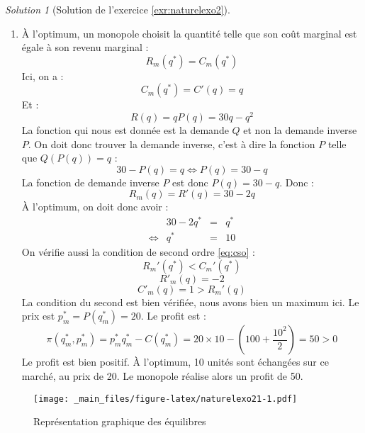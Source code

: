 \documentclass[
]{book}
\providecommand{\tightlist}{%
  \setlength{\itemsep}{0pt}\setlength{\parskip}{0pt}}
\theoremstyle{definition}
\theoremstyle{definition}
\theoremstyle{definition}
\theoremstyle{definition}
\theoremstyle{remark}
\newtheorem*{solution}{Solution}
\begin{document}
\begin{solution}[Solution de l'exercice \ref{exr:naturelexo2}]

\begin{enumerate}
\def\labelenumi{\arabic{enumi}.}
\tightlist
\item
  À l'optimum, un monopole choisit la quantité telle que son coût marginal est égale à son revenu marginal :
  \[R_m(q^*)=C_m(q^*)\]
  Ici, on a :
  \[C_m(q^*)=C'(q)=q\]
  Et :
  \[R(q) =qP(q)=30q-q^2\]
  La fonction qui nous est donnée est la demande \(Q\) et non la demande inverse \(P\).
  On doit donc trouver la demande inverse, c'est à dire la fonction \(P\) telle que \(Q(P(q))=q\) :
  \[30-P(q)=q \Leftrightarrow P(q) = 30-q\]
  La fonction de demande inverse \(P\) est donc \(P(q)=30-q\).
  Donc :
  \[R_m(q)=R'(q)=30-2q\]
  À l'optimum, on doit donc avoir :
  \[
  \begin{array}{crcl}
  &30-2q^*&=&q^*\\
  \Leftrightarrow & q^*&=&10
  \end{array}
  \]
  On vérifie aussi la condition de second ordre \eqref{eq:cso} :
  \[R_m'(q^*)<C_m'(q^*)\]
  \[R'_m(q)=-2\]
  \[C'_m(q)=1>R_m'(q)\]
  La condition du second est bien vérifiée, nous avons bien un maximum ici.
  Le prix est \(p^*_m=P(q^*_m)=20\).
  Le profit est :
  \[\pi(q_m^*, p_m^*)=p_m^*q_m^*-C(q_m^*)=20\times10-\left(100+\frac{10^2}{2}\right)=50>0\]
  Le profit est bien positif.
  À l'optimum, 10 unités sont échangées sur ce marché, au prix de 20.
  Le monopole réalise alors un profit de 50.
\end{enumerate}

\begin{figure}
\centering
\texttt{[image: \_main\_files/figure-latex/naturelexo21-1.pdf]}
\caption{\label{fig:naturelexo21}Représentation graphique des équilibres}
\end{figure}


\end{solution}
\end{document}
